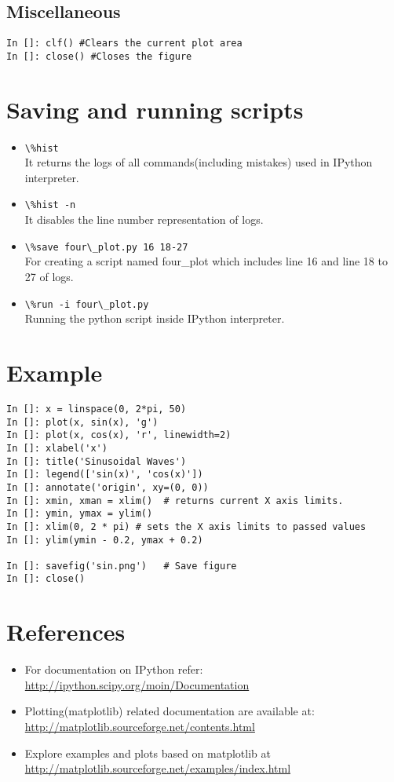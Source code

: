 \documentclass[12pt]{article}
\newcommand{\typ}[1]{\lstinline{#1}}
\begin{document}
\subsection{Miscellaneous}
\typ{In []: clf() #Clears the current plot area}\\
\typ{In []: close() #Closes the figure}
\section{Saving and running scripts}
\begin{itemize}
  \item \typ{\%hist}\\
  It returns the logs of all commands(including mistakes) used in IPython interpreter.
  \item \typ{\%hist -n}\\
It disables the line number representation of logs.
  \item \typ{\%save four\_plot.py 16 18-27}\\
For creating a script named four\_plot which includes line 16 and line 18 to 27 of logs.
  \item \typ{\%run -i four\_plot.py}\\
Running the python script inside IPython interpreter.
\end{itemize}

\section{Example}
  \begin{lstlisting}
In []: x = linspace(0, 2*pi, 50)
In []: plot(x, sin(x), 'g')
In []: plot(x, cos(x), 'r', linewidth=2)
In []: xlabel('x')
In []: title('Sinusoidal Waves')
In []: legend(['sin(x)', 'cos(x)'])
In []: annotate('origin', xy=(0, 0))
In []: xmin, xman = xlim()  # returns current X axis limits.
In []: ymin, ymax = ylim()
In []: xlim(0, 2 * pi) # sets the X axis limits to passed values
In []: ylim(ymin - 0.2, ymax + 0.2) 

In []: savefig('sin.png')   # Save figure
In []: close()              
  \end{lstlisting}

\section{References}
\begin{itemize}
  \item For documentation on IPython refer: \\ \url{http://ipython.scipy.org/moin/Documentation}
  \item Plotting(matplotlib) related documentation are available at:\\ \url{http://matplotlib.sourceforge.net/contents.html}
  \item Explore examples and plots based on matplotlib at \\ \url{http://matplotlib.sourceforge.net/examples/index.html}
\end{itemize}
\end{document}
